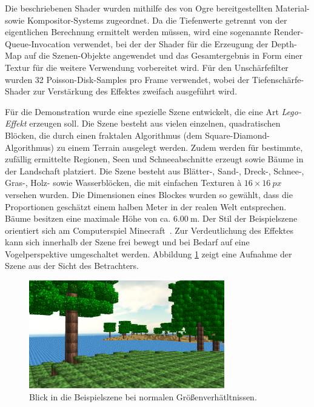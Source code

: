 \documentclass{acmsiggraph}                     %
\begin{document}
Die beschriebenen Shader wurden mithilfe des von Ogre bereitgestellten Material- sowie Kompositor-Systems zugeordnet. Da die Tiefenwerte getrennt von der eigentlichen Berechnung ermittelt werden müssen, wird eine sogenannte Render-Queue-Invocation verwendet, bei der der Shader für die Erzeugung der Depth-Map auf die Szenen-Objekte angewendet und das Gesamtergebnis in Form einer Textur für die weitere Verwendung vorbereitet wird. Für den Unschärfefilter wurden 32 Poisson-Disk-Samples pro Frame verwendet, wobei der Tiefenschärfe-Shader zur Verstärkung des Effektes zweifach ausgeführt wird.

Für die Demonstration wurde eine spezielle Szene entwickelt, die eine Art \emph{Lego-Effekt} erzeugen soll. Die Szene besteht aus vielen einzelnen, quadratischen Blöcken, die durch einen fraktalen Algorithmus (dem Square-Diamond-Algorithmus) zu einem Terrain ausgelegt werden. Zudem werden für bestimmte, zufällig ermittelte Regionen, Seen und Schneeabschnitte erzeugt sowie Bäume in der Landschaft platziert. Die Szene besteht aus Blätter-, Sand-, Dreck-, Schnee-, Gras-, Holz- sowie Wasserblöcken, die mit einfachen Texturen à $16\times\SI{16}{px}$ versehen wurden. Die Dimensionen eines Blockes wurden so gewählt, dass die Proportionen geschätzt einem halben Meter in der realen Welt entsprechen. Bäume besitzen eine maximale Höhe von ca. $\SI{6.00}{\meter}$. Der Stil der Beispielszene orientiert sich am Computerspiel Minecraft~\cite{Mojang:2011zr}. Zur Verdeutlichung des Effektes kann sich innerhalb der Szene frei bewegt und bei Bedarf auf eine Vogelperspektive umgeschaltet werden. Abbildung \ref{abb:block} zeigt eine Aufnahme der Szene aus der Sicht des Betrachters.

\begin{figure}[htbp]
\centering
\includegraphics[width=3.35in]{Blockcraft-1}
\caption{Blick in die Beispielszene bei normalen Größenverhätltnissen.}
\label{abb:block}
\end{figure}
\end{document}
